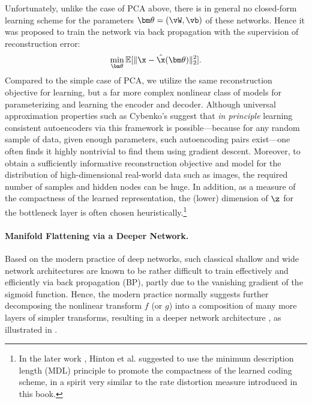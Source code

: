 \documentclass[../../book-main.tex]{subfiles}
\begin{document}
Unfortunately, unlike the case of PCA above, there is in general no
closed-form learning scheme for the parameters $\bm \theta =
(\vW, \vb)$ of these networks. Hence it was proposed to train the
network via back propagation with the supervision of reconstruction error:
\begin{equation}\label{eq:nonlinear-pca-ch5}
    \min_{\bm \theta} \mathbb{E}[ \|\x -
    \hat{\x}(\bm \theta)\|_2^2].
\end{equation}
Compared to the simple case of PCA, we utilize the same reconstruction objective
for learning, but a far more complex nonlinear class of models for
parameterizing and learning the encoder and decoder. Although universal
approximation properties such as Cybenko's suggest that \textit{in principle}
learning consistent autoencoders via this framework is possible---because for
any random sample of data, given enough parameters, such autoencoding pairs
exist---one often finds it highly nontrivial to find them using
gradient descent.
Moreover, to obtain a sufficiently informative reconstruction objective
and model for the
distribution of high-dimensional real-world data such as images, the required
number of samples and hidden nodes can be huge.
In addition, as a measure of the compactness of the learned representation, the
(lower) dimension of $\z$ for the bottleneck layer is often chosen
heuristically.\footnote{In the later work \cite{Hinton-1993}, Hinton
    et al. suggested to use the minimum description length (MDL)
    principle to promote
    the compactness of the learned coding scheme, in a spirit very
    similar to the
rate distortion measure introduced in this book.}

\paragraph{Manifold Flattening via a Deeper Network.}
Based on the modern practice of deep networks, such classical shallow
and wide network architectures are known to be rather difficult to
train effectively and efficiently via back propagation (BP), partly
due to the vanishing gradient of the sigmoid function. Hence, the
modern practice normally suggests further
decomposing the nonlinear transform $f$ (or $g$) into a composition of
many more layers of simpler transforms, resulting in a deeper network
architecture
\cite{Hinton504}, as illustrated in .
\end{document}
